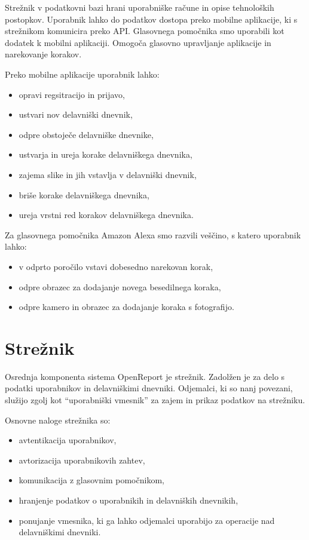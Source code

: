 \documentclass[a4paper, 12pt]{book}
\begin{document}
Strežnik v podatkovni bazi hrani uporabniške račune in opise tehnoloških postopkov.
Uporabnik lahko do podatkov dostopa preko mobilne aplikacije, ki s strežnikom komunicira preko API.
Glasovnega pomočnika smo uporabili kot dodatek k mobilni aplikaciji.
Omogoča glasovno upravljanje aplikacije in narekovanje korakov.

\bigbreak
Preko mobilne aplikacije uporabnik lahko:
\begin{itemize}
	\item opravi regsitracijo in prijavo,
	\item ustvari nov delavniški dnevnik,
	\item odpre obstoječe delavniške dnevnike,
	\item ustvarja in ureja korake delavniškega dnevnika,
	\item zajema slike in jih vstavlja v delavniški dnevnik,
	\item briše korake delavniškega dnevnika,
	\item ureja vrstni red korakov delavniškega dnevnika.
\end{itemize}

Za glasovnega pomočnika Amazon Alexa smo razvili veščino, s katero uporabnik lahko:

\begin{itemize}
	\item v odprto poročilo vstavi dobesedno narekovan korak,
	\item odpre obrazec za dodajanje novega besedilnega koraka,
	\item odpre kamero in obrazec za dodajanje koraka s fotografijo.
\end{itemize}



\section{Strežnik}

Osrednja komponenta sistema OpenReport je strežnik.
Zadolžen je za delo s podatki uporabnikov in delavniškimi dnevniki.
Odjemalci, ki so nanj povezani, služijo zgolj kot \enquote{uporabniški vmesnik} za zajem in prikaz podatkov na strežniku.


\noindent Osnovne naloge strežnika so:
\begin{itemize}
	\item avtentikacija uporabnikov,
	\item avtorizacija uporabnikovih zahtev,
	\item komunikacija z glasovnim pomočnikom,
	\item hranjenje podatkov o uporabnikih in delavniških dnevnikih, 
	\item ponujanje vmesnika, ki ga lahko odjemalci uporabijo za operacije nad delavniškimi dnevniki.
\end{itemize}
\end{document}
